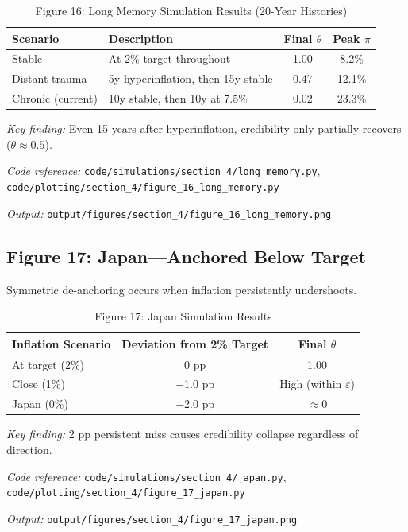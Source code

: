 \documentclass[11pt]{article}
\begin{document}
\begin{table}[htbp]
\centering
\caption{Figure 16: Long Memory Simulation Results (20-Year Histories)}
\label{tab:long_memory}
\begin{threeparttable}
\begin{tabular}{llcc}
\toprule
Scenario & Description & Final $\theta$ & Peak $\pi$ \\
\midrule
Stable & At 2\% target throughout & 1.00 & 8.2\% \\
Distant trauma & 5y hyperinflation, then 15y stable & 0.47 & 12.1\% \\
Chronic (current) & 10y stable, then 10y at 7.5\% & 0.02 & 23.3\% \\
\bottomrule
\end{tabular}
\begin{tablenotes}
\small
\item \textit{Key finding:} Even 15 years after hyperinflation, credibility only partially recovers ($\theta \approx 0.5$).
\item \textit{Code reference:} \texttt{code/simulations/section\_4/long\_memory.py}, \texttt{code/plotting/section\_4/figure\_16\_long\_memory.py}
\item \textit{Output:} \texttt{output/figures/section\_4/figure\_16\_long\_memory.png}
\end{tablenotes}
\end{threeparttable}
\end{table}

\subsection{Figure 17: Japan---Anchored Below Target}

Symmetric de-anchoring occurs when inflation persistently undershoots.

\begin{table}[htbp]
\centering
\caption{Figure 17: Japan Simulation Results}
\label{tab:japan}
\begin{threeparttable}
\begin{tabular}{lcc}
\toprule
Inflation Scenario & Deviation from 2\% Target & Final $\theta$ \\
\midrule
At target (2\%) & 0 pp & 1.00 \\
Close (1\%) & $-$1.0 pp & High (within $\varepsilon$) \\
Japan (0\%) & $-$2.0 pp & $\approx 0$ \\
\bottomrule
\end{tabular}
\begin{tablenotes}
\small
\item \textit{Key finding:} 2 pp persistent miss causes credibility collapse regardless of direction.
\item \textit{Code reference:} \texttt{code/simulations/section\_4/japan.py}, \texttt{code/plotting/section\_4/figure\_17\_japan.py}
\item \textit{Output:} \texttt{output/figures/section\_4/figure\_17\_japan.png}
\end{tablenotes}
\end{threeparttable}
\end{table}
\end{document}
